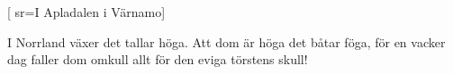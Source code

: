 
[
  sr={I Apladalen i Värnamo}]
  
\beginverse*
I Norrland växer det tallar höga.
Att dom är höga det båtar föga,
för en vacker dag faller dom omkull
allt för den eviga törstens skull!
\endverse
\endsong